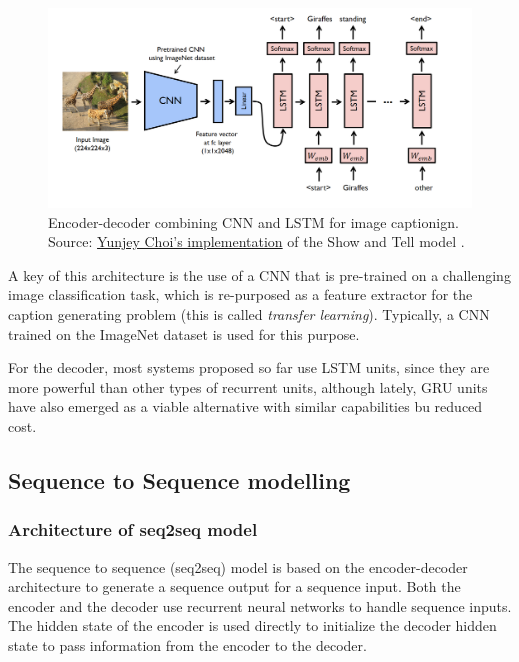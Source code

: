 \begin{figure}[hpt]
	\centering
	\includegraphics[scale=0.3]{images/ch3/cnn-rnn.png}
	\caption{Encoder-decoder combining CNN and LSTM for image captionign. Source:  \href{https://github.com/yunjey/pytorch-tutorial/tree/master/tutorials/03-advanced/image_captioning}{Yunjey Choi's implementation} of the Show and Tell model \citep{Vinyals2015}.}
	\label{fig:cnn-rnn}
\end{figure}

A key of this architecture is the use of a CNN that is pre-trained on a challenging image classification task, which is re-purposed as a feature extractor for the caption generating problem (this is called \textit{transfer learning}). Typically, a CNN trained on the ImageNet dataset is used for this purpose.

For the decoder, most systems proposed so far use LSTM units, since they are more powerful than other types of recurrent units, although lately, GRU units have also emerged as a viable alternative with similar capabilities bu reduced cost.

\subsection{Sequence to Sequence modelling}\label{subsec:seq2seq}

\subsubsection{Architecture of seq2seq model}

The sequence to sequence (seq2seq) model is based on the encoder-decoder architecture to generate a sequence output for a sequence input. Both the encoder and the decoder use recurrent neural networks to handle sequence inputs. The hidden state of the encoder is used directly to initialize the decoder hidden state to pass information from the encoder to the decoder.


